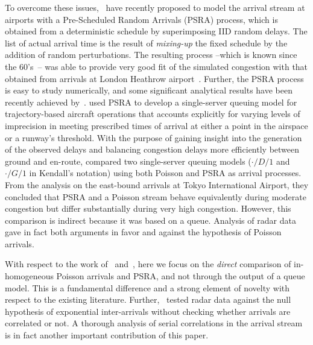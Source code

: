 \documentclass[draft,review]{elsarticle}
\begin{document}
To overcome these issues,~\citet{guadagni2011queueing} have recently proposed to model the arrival stream at airports with a Pre-Scheduled Random Arrivals (\ac{PSRA}) process, which is obtained from a deterministic schedule by superimposing \ac{IID} random delays.
The list of actual arrival time is the result of \emph{mixing-up} the fixed schedule by the addition of random perturbations.
The resulting process --which is known since the 60's~\citep{Kendall1964}-- was able to provide very good fit of the simulated congestion with that obtained from arrivals at London Heathrow airport~\citep{caccavale2014model}.
Further, the \ac{PSRA} process is easy to study numerically, and some significant analytical results have been recently achieved by~\citet{lancia2013advances}.
\citet{nikoleris2012queueing} used \ac{PSRA} to develop a single-server queuing model for trajectory-based aircraft operations that accounts explicitly for varying levels of imprecision in meeting prescribed times of arrival at either a point in the airspace or a runway's threshold.
With the purpose of gaining insight into the generation of the observed delays and balancing congestion delays more efficiently between ground and en-route, \citet{gwiggner2014data} compared two single-server queuing models (\(\cdot/D/1\) and \(\cdot/G/1\) in Kendall's notation) using both Poisson and \ac{PSRA} as arrival processes.
From the analysis on the east-bound arrivals at Tokyo International Airport, they concluded that \ac{PSRA} and a Poisson stream behave equivalently during moderate congestion but differ substantially during very high congestion.
However, this comparison is indirect because it was based on a queue.
Analysis of radar data gave in fact both arguments in favor and against the hypothesis of Poisson arrivals.

With respect to the work of~\citep{caccavale2014model} and~\citet{gwiggner2014data}, here we focus on the \emph{direct} comparison of in-homogeneous Poisson arrivals and \ac{PSRA}, and not through the output of a queue model.
This is a fundamental difference and a strong element of novelty with respect to the existing literature.
Further,~\citet{gwiggner2014data} tested radar data against the null hypothesis of exponential inter-arrivals without checking whether arrivals are correlated or not.
A thorough analysis of serial correlations in the arrival stream is in fact another important contribution of this paper.
\end{document}
